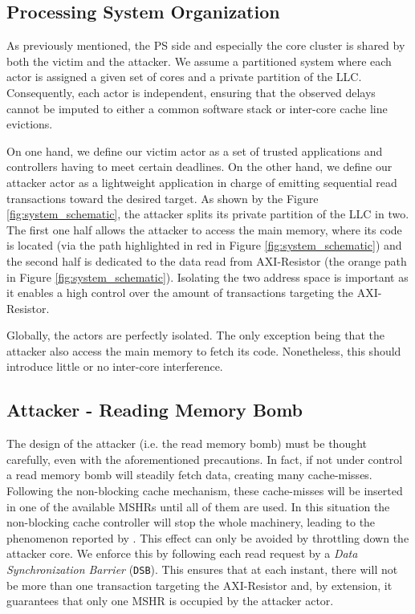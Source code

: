     \subsection{Processing System Organization}
        \label{subsec:processing_system_organization}
        As previously mentioned, the PS side and especially the core cluster is shared by both the victim and the attacker.
        We assume a partitioned system where each actor is assigned a given set of cores and a private partition of the LLC.
        Consequently, each actor is independent, ensuring that the observed delays cannot be imputed to either a common software stack or inter-core cache line evictions.

        On one hand, we define our victim actor as a set of trusted applications and controllers having to meet certain deadlines.
        On the other hand, we define our attacker actor as a lightweight application in charge of emitting sequential read transactions toward the desired target.
        As shown by the Figure \ref{fig:system_schematic}, the attacker splits its private partition of the LLC in two.
        The first one half allows the attacker to access the main memory, where its code is located (via the path highlighted in red in Figure \ref{fig:system_schematic}) and the second half is dedicated to the data read from AXI-Resistor (the orange path in Figure \ref{fig:system_schematic}).
        Isolating the two address space is important as it enables a high control over the amount of transactions targeting the AXI-Resistor.

        Globally, the actors are perfectly isolated.
        The only exception being that the attacker also access the main memory to fetch its code.
        Nonetheless, this should introduce little or no inter-core interference.

    \subsection{Attacker - Reading Memory Bomb}
        \label{subsec:attacker_reading_memory_bomb}
        The design of the attacker (i.e. the read memory bomb) must be thought carefully, even with the aforementioned precautions.
        In fact, if not under control a read memory bomb will steadily fetch data, creating many cache-misses.
        Following the non-blocking cache mechanism, these cache-misses will be inserted in one of the available MSHRs until all of them are used.
        In this situation the non-blocking cache controller will stop the whole machinery, leading to the phenomenon reported by \cite{Heechul_DDOS_attacks_on_shared_cache}.
        This effect can only be avoided by throttling down the attacker core.
        We enforce this by following each read request by a \emph{Data Synchronization Barrier} (\texttt{DSB}).
        This ensures that at each instant, there will not be more than one transaction targeting the AXI-Resistor and, by extension, it guarantees that only one MSHR is occupied by the attacker actor.

